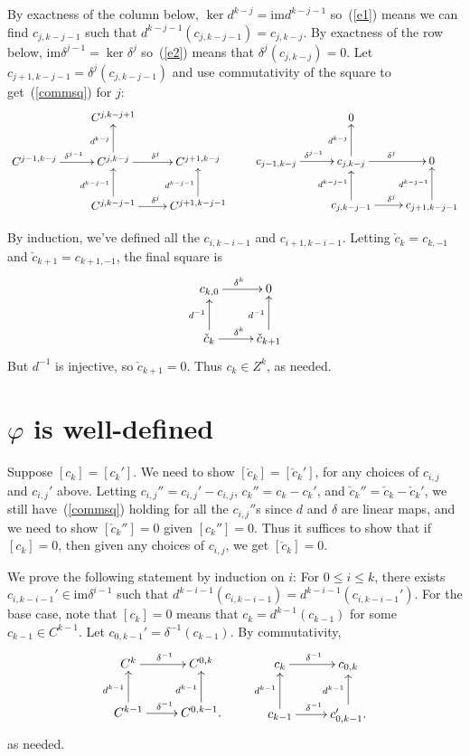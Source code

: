 \documentclass[12pt]{article}
\theoremstyle{norm}
\newcommand{\de}[0]{\delta}
\newcommand{\ph}[0]{\varphi}
\newcommand{\im}[0]{\text{im}}
\begin{document}
By exactness of the column below, $\ker d^{k-j}=\im d^{k-j-1}$ so~(\ref{e1}) means we can find $c_{j,k-j-1}$ such that $d^{k-j-1}(c_{j,k-j-1})=c_{j,k-j}$. By exactness of the row below, $\im \de^{j-1}=\ker \de^{j}$ so~(\ref{e2}) means that $\de^{j}(c_{j,k-j})=0$. Let $c_{j+1,k-j-1}=\de^{j}(c_{j,k-j-1})$ and use commutativity of the square to get~(\ref{commsq}) for $j$:
%
\[
\xymatrix{
&C^{j,k-j+1}&\\
C^{j-1,k-j} \ar[r]^{\de^{j-1}}&C^{j,k-j}\ar[u]^{d^{k-j}}\ar[r]^{\de^j} & C^{j+1,k-j}\\
&C^{j,k-j-1}\ar[u]^{d^{k-j-1}}\ar[r]^{\de^j} & C^{j+1,k-j-1}\ar[u]^{d^{k-j-1}}
}
\qquad
\xymatrix{
&0&\\
c_{j-1,k-j} \ar[r]^{\de^{j-1}}&c_{j,k-j}\ar[u]^{d^{k-j}}\ar[r]^{\de^j} & 0\\
&c_{j,k-j-1}\ar[u]^{d^{k-j-1}}\ar[r]^{\de^j} & c_{j+1,k-j-1}\ar[u]^{d^{k-j-1}}
}
\]

By induction, we've defined all the $c_{i,k-i-1}$ and $c_{i+1,k-i-1}$. Letting $\check c_k=c_{k,-1}$ and $\check c_{k+1}=c_{k+1,-1}$, the final square is
\[
\xymatrix{
c_{k,0}\ar[r]^{\de^k} & 0\\
\check c_{k}\ar[u]^{d^{-1}} \ar[r]^{\de^k} &\check c_{k+1}\ar[u]^{d^{-1}}
}
\]
But $d^{-1}$ is injective, so $\check c_{k+1}=0$. Thus $c_k\in Z^k$, as needed.

\section{$\ph$ is well-defined}
Suppose $[c_k]=[c_k']$. We need to show $[\check c_k]=[\check c_k']$, for any choices of $c_{i,j}$ and $c_{i,j}'$ above. Letting $c_{i,j}''=c_{i,j}'-c_{i,j}$,  $c_k''=c_k-c_k'$, and $\check c_{k}''=\check c_k-\check c_k'$, we still have~(\ref{commsq}) holding for all the $c_{i,j}''$s since $d$ and $\de$ are linear maps, and we need to show $[\check c_k'']=0$ given $[c_k'']=0$. Thus it suffices to show that if $[c_k]=0$, then given any choices of $c_{i,j}$, we get $[\check c_k]=0$.

We prove the following statement by induction on $i$: For $0\le i\le k$, 
there exists $c_{i,k-i-1}'\in \im \de^{i-1}$ such that $d^{k-i-1}(c_{i,k-i-1})=d^{k-i-1}(c_{i,k-i-1}')$. 
For the base case, note that $[c_k]=0$ means that $c_k=d^{k-1} (c_{k-1})$ for some $c_{k-1}\in C^{k-1}$. Let $c_{0,k-1}'=\de^{-1}(c_{k-1})$. By commutativity,
\[
\xymatrix{
C^k\ar[r]^{\de^{-1}}& C^{0,k}\\
C^{k-1}\ar[r]^{\de^{-1}}\ar[u]^{d^{k-1}} & C^{0,k-1}\ar[u]^{d^{k-1}}.
}\qquad
\xymatrix{
c_k\ar[r]^{\de^{-1}}& c_{0,k}\\
c_{k-1}\ar[r]^{\de^{-1}}\ar[u]^{d^{k-1}} & c_{0,k-1}'\ar[u]^{d^{k-1}}.
}
\]
as needed.
\end{document}
